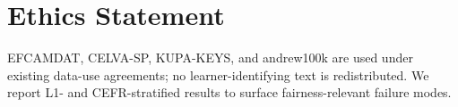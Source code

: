 \documentclass[11pt]{article}
\begin{document}
\section*{Ethics Statement}
EFCAMDAT, CELVA-SP, KUPA-KEYS, and andrew100k are used under existing
data-use agreements; no learner-identifying text is redistributed. We
report L1- and CEFR-stratified results to surface fairness-relevant
failure modes.


\end{document}
